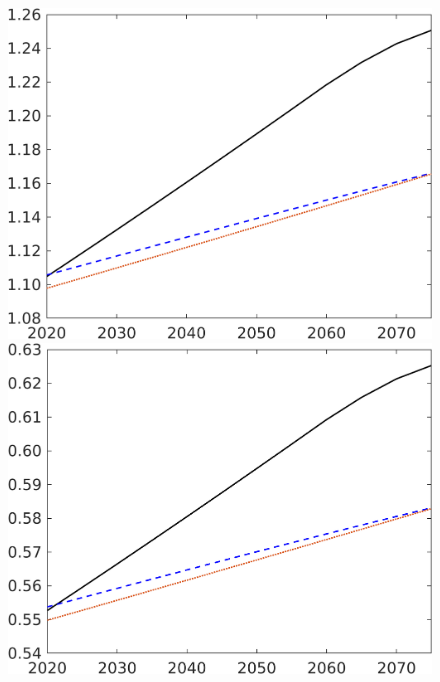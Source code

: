\begin{figure}[h!!]
\begin{minipage}[]{0.32\textwidth}
	\end{minipage}
	\begin{minipage}[]{0.32\textwidth}
		\includegraphics[width=1\textwidth]{../../codding_model/own_basedOnFried/optimalPol_elastS_DisuSci/figures/all_1705/Y_CompEffOPT_NOT_NoTaus_spillover0_sep1_BN0_ineq0_red0_etaa0.79_lgd0.png}
	\end{minipage}
	\begin{minipage}[]{0.32\textwidth}
		\includegraphics[width=1\textwidth]{../../codding_model/own_basedOnFried/optimalPol_elastS_DisuSci/figures/all_1705/E_CompEffOPT_NOT_NoTaus_spillover0_sep1_BN0_ineq0_red0_etaa0.79_lgd0.png}

\end{minipage}
\end{figure}
